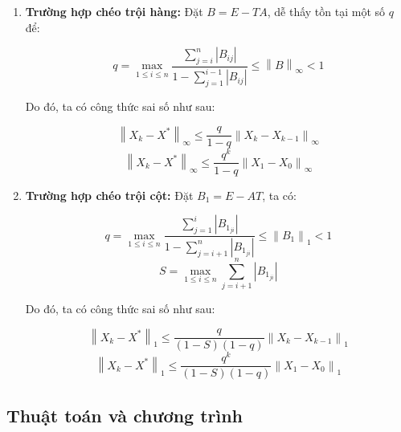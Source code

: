     \begin{enumerate}[label = (\roman*)]
        \item \textbf{Trường hợp chéo trội hàng:} Đặt $B = E - TA$, dễ thấy tồn tại một số $q$ để:
        
        $$ q = \max\limits_{1 \leq i \leq n} \frac{\sum\limits_{j=i}^{n} \left\lvert B_{ij} \right\rvert}{1 - \sum\limits_{j=1}^{i-1} \left\lvert B_{ij} \right\rvert} \leq \left\lVert B \right\rVert_{\infty} < 1 $$
        
        Do đó, ta có công thức sai số như sau:
        
        \begin{equation}
            \left\lVert X_{k} - X^{*} \right\rVert_{\infty} \leq \frac{q}{1 - q} \left\lVert X_{k} - X_{k - 1} \right\rVert_{\infty}
        \end{equation}
        \begin{equation}
            \left\lVert X_{k} - X^{*} \right\rVert_{\infty} \leq \frac{q^{k}}{1 - q} \left\lVert X_{1} - X_{0} \right\rVert_{\infty}
        \end{equation}

        \newpage

        \item \textbf{Trường hợp chéo trội cột:} Đặt $B_{1} = E - AT$, ta có:
        
        $$ q = \max\limits_{1 \leq i \leq n} \frac{\sum\limits_{j=1}^{i} \left\lvert B_{1_{ji}} \right\rvert}{1 - \sum\limits_{j=i+1}^{n} \left\lvert B_{1_{ji}} \right\rvert} \leq \left\lVert B_{1} \right\rVert_{1} < 1 $$ 
        $$ S = \max\limits_{1 \leq i \leq n} \sum\limits_{j=i+1}^{n} \left\lvert B_{1_{ji}} \right\rvert $$
        
        Do đó, ta có công thức sai số như sau\cite{giaotrinhgiaitichso}: 
        
        \begin{equation}
            \left\lVert X_{k} - X^{*} \right\rVert_{1} \leq \frac{q}{(1 - S)(1 - q)} \left\lVert X_{k} - X_{k - 1} \right\rVert_{1} 
        \end{equation}
        \begin{equation}
            \left\lVert X_{k} - X^{*} \right\rVert_{1} \leq \frac{q^{k}}{(1 - S)(1 - q)} \left\lVert X_{1} - X_{0} \right\rVert_{1}
        \end{equation}

    \end{enumerate}

\subsection{Thuật toán và chương trình}

